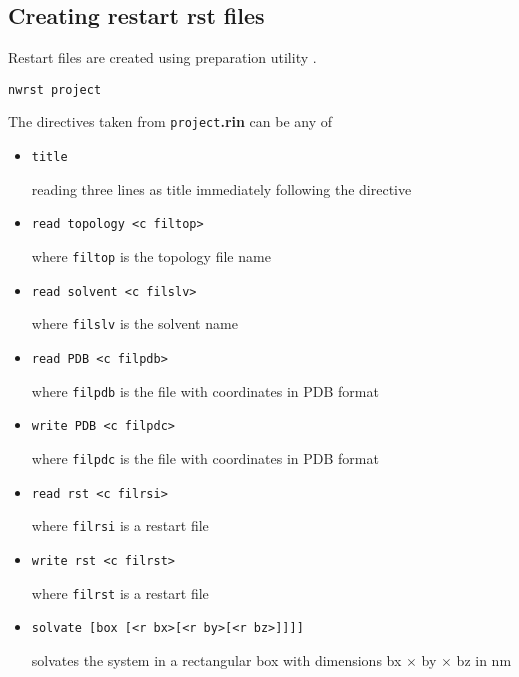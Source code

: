 \subsection{Creating restart {\bf rst} files}
\label{nwrst}
Restart files are created using preparation utility \nwrst.
\begin{verbatim}
nwrst project
\end{verbatim}
The directives taken from {\tt project}{\bf.rin} can be any of
\begin{itemize}

\item
\begin{verbatim}
title
\end{verbatim}
reading three lines as title immediately following the directive

\item
\begin{verbatim}
read topology <c filtop>
\end{verbatim}
where {\tt filtop} is the topology file name

\item
\begin{verbatim}
read solvent <c filslv>
\end{verbatim}
where {\tt filslv} is the solvent name

\item
\begin{verbatim}
read PDB <c filpdb>
\end{verbatim}
where {\tt filpdb} is the file with coordinates in PDB format

\item
\begin{verbatim}
write PDB <c filpdc>
\end{verbatim}
where {\tt filpdc} is the file with coordinates in PDB format

\item
\begin{verbatim}
read rst <c filrsi>
\end{verbatim}
where {\tt filrsi} is a restart file

\item
\begin{verbatim}
write rst <c filrst>
\end{verbatim}
where {\tt filrst} is a restart file

\item
\begin{verbatim}
solvate [box [<r bx>[<r by>[<r bz>]]]]
\end{verbatim}
solvates the system in a rectangular box with dimensions 
bx $\times$ by $\times$ bz in nm


\end{itemize}
